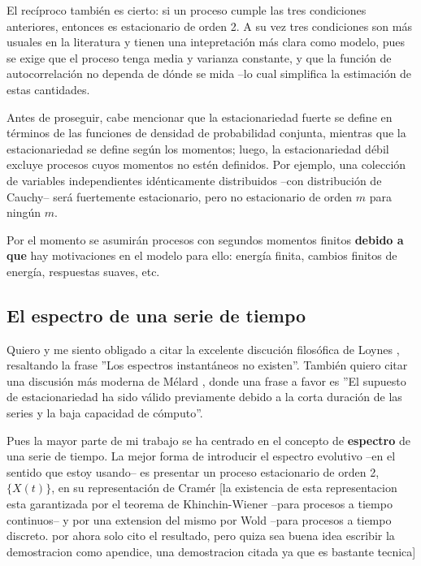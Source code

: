 El rec\'iproco tambi\'en es cierto: si un proceso cumple las tres condiciones anteriores,
entonces es estacionario de orden 2. A su vez tres condiciones son m\'as usuales en la literatura
y tienen una intepretaci\'on m\'as clara como modelo, pues se exige que el proceso tenga media
y varianza constante, y que la funci\'on de autocorrelaci\'on no dependa de d\'onde se mida --lo
cual simplifica la estimaci\'on de estas cantidades.

Antes de proseguir, cabe mencionar que la estacionariedad fuerte se define
en t\'erminos de las funciones de densidad de probabilidad conjunta, mientras que la 
estacionariedad se define seg\'un los momentos; luego, la estacionariedad d\'ebil excluye 
procesos cuyos momentos no est\'en definidos. Por ejemplo, una colecci\'on de variables
independientes id\'enticamente distribuidos --con distribuci\'on de Cauchy-- ser\'a
fuertemente estacionario, pero no estacionario de orden $m$ para ning\'un $m$. 

Por el momento se asumir\'an procesos con segundos momentos finitos 
\textbf{debido a que} hay motivaciones
en el modelo para ello: energ\'ia finita, cambios finitos de energ\'ia, respuestas suaves, etc.


\subsection{El espectro de una serie de tiempo}

Quiero y me siento obligado a citar la excelente discuci\'on
filos\'ofica
de Loynes \cite{Loynes68}, resaltando la frase ''Los espectros instant\'aneos no existen''.
Tambi\'en quiero citar una discusi\'on m\'as moderna de M\'elard \cite{Melard89}, donde una
frase a favor es ''El supuesto de estacionariedad ha sido v\'alido previamente debido a la corta
duraci\'on de las series y la baja capacidad de c\'omputo''.

Pues la mayor parte de mi trabajo se ha centrado en el concepto de \textbf{espectro} de una serie
de tiempo. La mejor forma de introducir el espectro evolutivo 
--en el sentido que estoy usando-- es
presentar un proceso estacionario de orden 2,
 $\{X(t)\}$, en su representaci\'on de Cram\'er \cite{Priestley81}
[la existencia de esta representacion esta garantizada por el teorema de Khinchin-Wiener --para
procesos a tiempo continuos-- y por una extension del mismo por Wold --para procesos a tiempo
discreto.
por ahora solo cito el resultado, pero quiza sea buena idea escribir la demostracion
como apendice, una demostracion citada ya que es bastante tecnica]

